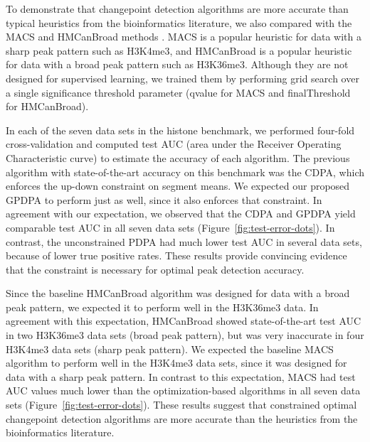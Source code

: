 \documentclass{article}
\begin{document}
To demonstrate that changepoint detection algorithms are more accurate
than typical heuristics from the bioinformatics literature, we also
compared with the MACS and HMCanBroad methods \citep{MACS,
  HMCan}. MACS is a popular heuristic for data with a sharp peak
pattern such as H3K4me3, and \mbox{HMCanBroad} is a popular heuristic
for data with a broad peak pattern such as H3K36me3. Although they are
not designed for supervised learning, we trained them by performing
grid search over a single significance threshold parameter (qvalue for
MACS and finalThreshold for HMCanBroad).


In each of the seven data sets in the histone benchmark,
we performed four-fold cross-validation and computed test AUC (area
under the Receiver Operating Characteristic curve) to estimate the
accuracy of each algorithm. The previous algorithm with
state-of-the-art accuracy on this benchmark was the CDPA, which
enforces the up-down constraint on segment means. We expected our
proposed GPDPA to perform just as well, since it also enforces that
constraint. In agreement with our expectation, we observed that the
CDPA and GPDPA yield comparable test AUC in all seven data sets
(Figure~\ref{fig:test-error-dots}). In contrast, the unconstrained
PDPA had much lower test AUC in several data sets, because of lower
true positive rates. These results provide convincing evidence that
the constraint is necessary for optimal peak detection accuracy.

Since the baseline HMCanBroad algorithm was designed for data with a
broad peak pattern, we expected it to perform well in the H3K36me3
data. In agreement with this expectation, HMCanBroad showed
state-of-the-art test AUC in two H3K36me3 data sets (broad peak
pattern), but was very inaccurate in four H3K4me3 data sets (sharp
peak pattern). We expected the baseline MACS algorithm to perform well
in the H3K4me3 data sets, since it was designed for data with a sharp
peak pattern. In contrast to this expectation, MACS had test AUC
values much lower than the optimization-based algorithms in all seven
data sets (Figure~\ref{fig:test-error-dots}). These results suggest
that constrained optimal changepoint detection algorithms are more
accurate than the heuristics from the bioinformatics literature.
\end{document}
